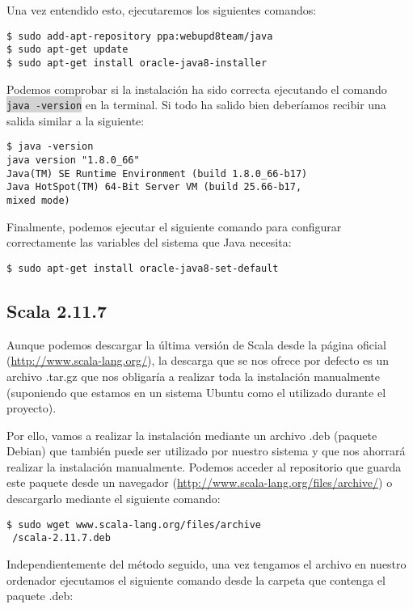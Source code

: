 Una vez entendido esto, ejecutaremos los siguientes comandos:

\begin{lstlisting}
$ sudo add-apt-repository ppa:webupd8team/java
$ sudo apt-get update
$ sudo apt-get install oracle-java8-installer
\end{lstlisting}

Podemos comprobar si la instalación ha sido correcta ejecutando el comando \colorbox{lightgray}{\lstinline|java -version|} en la terminal. Si todo ha salido bien deberíamos recibir una salida similar a la siguiente:

\begin{lstlisting}
$ java -version
java version "1.8.0_66"
Java(TM) SE Runtime Environment (build 1.8.0_66-b17)
Java HotSpot(TM) 64-Bit Server VM (build 25.66-b17,
mixed mode)
\end{lstlisting}

Finalmente, podemos ejecutar el siguiente comando para configurar correctamente las variables del sistema que Java necesita:

\begin{lstlisting}
$ sudo apt-get install oracle-java8-set-default
\end{lstlisting}

\subsection{Scala 2.11.7}
Aunque podemos descargar la última versión de Scala desde la página oficial (\url{http://www.scala-lang.org/}), la descarga que se nos ofrece por defecto es un archivo .tar.gz que nos obligaría a realizar toda la instalación manualmente (suponiendo que estamos en un sistema Ubuntu como el utilizado durante el proyecto).

Por ello, vamos a realizar la instalación mediante un archivo .deb (paquete Debian) que también puede ser utilizado por nuestro sistema y que nos ahorrará realizar la instalación manualmente. Podemos acceder al repositorio que guarda este paquete desde un navegador (\url{http://www.scala-lang.org/files/archive/}) o descargarlo mediante el siguiente comando:

\begin{lstlisting}
$ sudo wget www.scala-lang.org/files/archive
 /scala-2.11.7.deb
\end{lstlisting}

Independientemente del método seguido, una vez tengamos el archivo en nuestro ordenador ejecutamos el siguiente comando desde la carpeta que contenga el paquete .deb:

